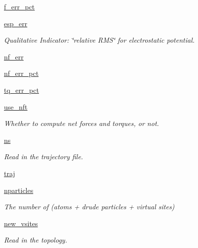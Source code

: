 \begin{DoxyCompactItemize}
\hyperlink{classforcebalance_1_1abinitio_1_1AbInitio_ab6ee932ad4689f538c746310939dd0bc}{f\-\_\-err\-\_\-pct}
\item 
\hyperlink{classforcebalance_1_1abinitio_1_1AbInitio_abdc625c3149cee375b56b4e0d73034fe}{esp\-\_\-err}
\begin{DoxyCompactList}\small\item\em Qualitative Indicator\-: \char`\"{}relative R\-M\-S\char`\"{} for electrostatic potential. \end{DoxyCompactList}\item 
\hyperlink{classforcebalance_1_1abinitio_1_1AbInitio_a89de620e9aa500481c9e1ded99e14f72}{nf\-\_\-err}
\item 
\hyperlink{classforcebalance_1_1abinitio_1_1AbInitio_a184edac2cb27a999c363595ea59d8163}{nf\-\_\-err\-\_\-pct}
\item 
\hyperlink{classforcebalance_1_1abinitio_1_1AbInitio_a184f2a783b2710f6f75842afdeccf14e}{tq\-\_\-err\-\_\-pct}
\item 
\hyperlink{classforcebalance_1_1abinitio_1_1AbInitio_afd8d179560a295ffa6c6309843c59279}{use\-\_\-nft}
\begin{DoxyCompactList}\small\item\em Whether to compute net forces and torques, or not. \end{DoxyCompactList}\item 
\hyperlink{classforcebalance_1_1abinitio_1_1AbInitio_a1e8248e2efe952362b1b21462a70b540}{ns}
\begin{DoxyCompactList}\small\item\em Read in the trajectory file. \end{DoxyCompactList}\item 
\hyperlink{classforcebalance_1_1abinitio_1_1AbInitio_a7b52d5101bfa4fde7129c84c0558ad14}{traj}
\item 
\hyperlink{classforcebalance_1_1abinitio_1_1AbInitio_aef3798e4666b91ecc4c526b679eb4908}{nparticles}
\begin{DoxyCompactList}\small\item\em The number of (atoms + drude particles + virtual sites) \end{DoxyCompactList}\item 
\hyperlink{classforcebalance_1_1abinitio_1_1AbInitio_a64f1aeadac4d7b09424c20b83e5ad5af}{new\-\_\-vsites}
\begin{DoxyCompactList}\small\item\em Read in the topology. \end{DoxyCompactList}\item 

\end{DoxyCompactItemize}
